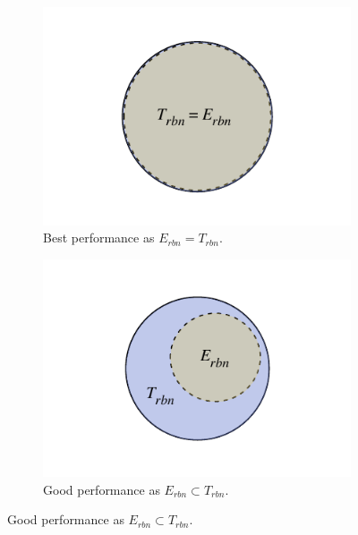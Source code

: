 \begin{figure}[p]
  \centering
  \hspace{\fill}
  \begin{subfigure}[b]{0.475\textwidth}
    \includegraphics[width=\textwidth]{images/evaluation/set_explain/T_is_E}
    \caption{Best performance as $E_{rbn} = T_{rbn}$.}
    \label{fig:evaluation:metrics:character_rec:sets:best}
  \end{subfigure}
  \hspace{\fill}
  \begin{subfigure}[b]{0.475\textwidth}
    \includegraphics[width=\textwidth]{images/evaluation/set_explain/E_subset_of_T}
    \caption{Good performance as $E_{rbn} \subset T_{rbn}$.}
    \label{fig:evaluation:metrics:character_rec:sets:good}
  \end{subfigure}

\end{figure}
